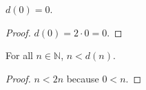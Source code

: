\begin{lemma}\label{lem:double-zero}
$d(0) = 0$.
\end{lemma}

\begin{proof}
$d(0) = 2 \cdot 0 = 0$.
\end{proof}

\begin{theorem}\label{thm:double-strict}
For all $n \in \mathbb{N}$, $n < d(n)$.
\end{theorem}

\begin{proof}
$n < 2n$ because $0 < n$.
\end{proof}
